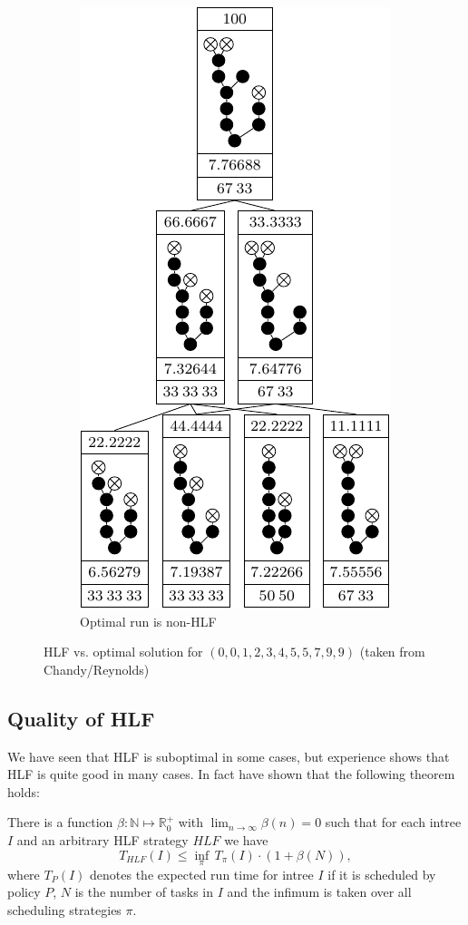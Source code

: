 \begin{figure}[ht]
\begin{subfigure}{.45\linewidth}
    \includegraphics{p3/hlf_not_optimal/00123455799_opt.pdf}
    \caption{Optimal run is non-HLF}
  \end{subfigure}
  \caption{HLF vs. optimal solution for $(0,0,1,2,3,4,5,5,7,9,9)$ (taken from Chandy/Reynolds)}
  \label{fig:hlf-vs-opt-00123455799}
\end{figure}

\subsection{Quality of HLF}
\label{sec:suboptimal-hlf-quality}

We have seen that HLF is suboptimal in some cases, but experience shows that HLF is quite good in many cases. In fact \cite{journals/siamcomp/PapadimitriouT87} have shown that the following theorem holds:

\begin{theorem}
  There is a function $\beta: \mathbb{N} \mapsto \mathbb{R}^+_0$ with $\lim_{n\rightarrow \infty} \beta(n) = 0$ such that for each intree $I$ and an arbitrary HLF strategy $HLF$ we have
  \begin{equation*}
    T_{HLF}(I) \leq \inf_\pi\, T_{\pi}(I) \cdot \left( 1+\beta(N) \right),
  \end{equation*}
  where $T_{P}(I)$ denotes the expected run time for intree $I$ if it is scheduled by policy $P$, $N$ is the number of tasks in $I$ and the infimum is taken over all scheduling strategies $\pi$.
\end{theorem}

